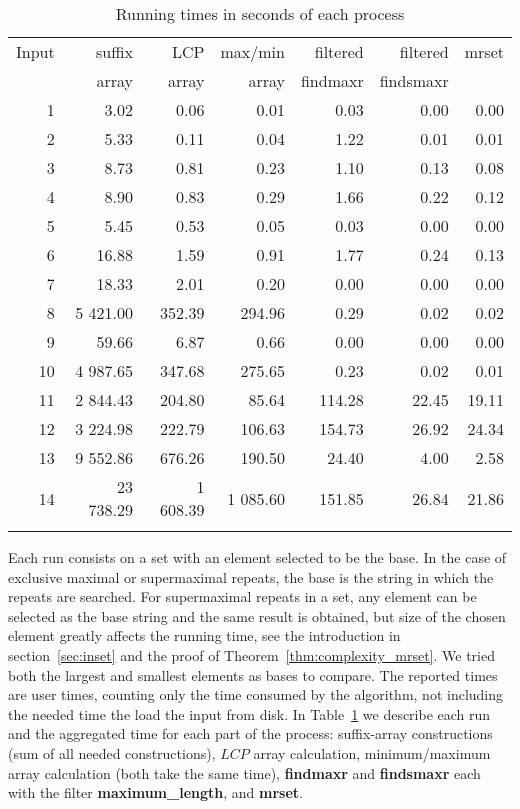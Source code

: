 \documentclass[submission]{dmtcs}
\newcommand\+[1]{\mathcal{#1}}
\begin{document}
\begin{table}[h!]
\small
\caption{Running times in seconds of each process\label{tbl:runningtime}}
\begin{center}
\begin{tabular}{rrrrrrr}
\hline
Input & suffix & LCP & max/min &
    filtered & filtered & mrset \\
 & array & array & array &
  findmaxr & findsmaxr & \\
\hline
1 & 3.02 & 0.06 & 0.01 & 0.03 & 0.00 & 0.00 \\
2 & 5.33 & 0.11 & 0.04 & 1.22 & 0.01 & 0.01 \\
3 & 8.73 & 0.81 & 0.23 & 1.10 & 0.13 & 0.08 \\
4 & 8.90 & 0.83 & 0.29 & 1.66 & 0.22 & 0.12 \\
5  & 5.45 & 0.53 & 0.05 & 0.03 & 0.00 & 0.00 \\
6 & 16.88 & 1.59 & 0.91 & 1.77 & 0.24 & 0.13 \\
7 & 18.33 & 2.01 & 0.20 & 0.00 & 0.00 & 0.00 \\
8 & 5 421.00 & 352.39 & 294.96 & 0.29 & 0.02 & 0.02 \\
9 & 59.66 & 6.87 & 0.66 & 0.00 & 0.00 & 0.00 \\
10 & 4 987.65 & 347.68 & 275.65 & 0.23 & 0.02 & 0.01 \\
11 & 2 844.43 & 204.80 & 85.64 & 114.28 & 22.45 & 19.11 \\
12 & 3 224.98 & 222.79 & 106.63 & 154.73 & 26.92 & 24.34 \\
13 & 9 552.86 & 676.26 & 190.50 & 24.40 & 4.00 & 2.58 \\
14& 23 738.29 & 1 608.39 & 1 085.60 & 151.85 & 26.84 & 21.86 \\
\hline\\
\end{tabular}
\end{center}
\normalsize
\end{table}

Each run consists on a set with an element selected to be the base. In the 
case of exclusive maximal or supermaximal repeats, 
the base is the string in which the repeats are
searched. For supermaximal repeats in a set, 
any element can be selected as the
base string and the same result is obtained, but size of the chosen 
element greatly affects the running time, 
see the introduction in section~\ref{sec:inset}
and the proof of Theorem~\ref{thm:complexity_mrset}.
We tried both the largest and smallest elements as bases to compare.
The reported times are user times, counting only the time consumed
by the algorithm, not including the needed time  the load the input from disk.
%
In Table~\ref{tbl:runningtime} we describe each run and the aggregated time for each
part of the process: suffix-array constructions (sum of all needed
constructions), $LCP$ array calculation, minimum/maximum array calculation (both
take the same time), {\bf findmaxr} and
{\bf findsmaxr} each with the filter {\bf maximum\_length},
 and {\bf mrset}.
\end{document}
